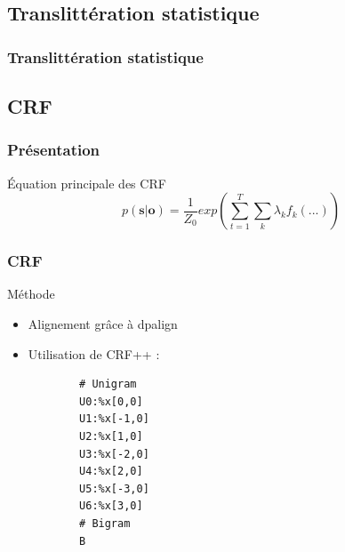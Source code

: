 \documentclass{beamer}
\begin{document}
\subsection{Translittération statistique}

\begin{frame}
	\frametitle{Translittération statistique}
\end{frame}

\subsection{CRF}

\begin{frame}
\frametitle{Présentation}
\begin{block}{Équation principale des CRF}
\begin{equation}
p(\textbf{s}|\textbf{o}) = \frac{1}{Z_0}exp(\sum_{t=1}^T\sum_k \lambda_k f_k(...))
\label{eqcrf}
\end{equation}
\end{block}
\end{frame}

\begin{frame}[fragile]
\frametitle{CRF}
	\begin{block}{Méthode}
		\begin{itemize}
		\item Alignement gr\^ace à dpalign
		\item Utilisation de CRF++ :
		{\scriptsize \begin{verbatim}
		# Unigram
		U0:%x[0,0]
		U1:%x[-1,0]
		U2:%x[1,0]
		U3:%x[-2,0]
		U4:%x[2,0]
		U5:%x[-3,0]
		U6:%x[3,0]
		# Bigram
		B
		\end{verbatim}}
		\end{itemize}
	\end{block}
\end{frame}
\end{document}
